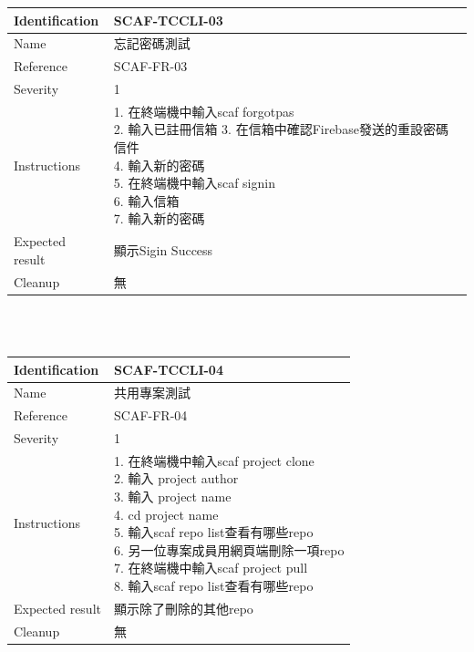 \documentclass{report}
\begin{document}
\begin{tabularx}{\textwidth}{
  |p{}%
  |p{}|%
  }
  \hline
  \centering Identification &  SCAF-TCCLI-03 \\
  \hline
  \centering Name & 忘記密碼測試 \\
  \hline
  \centering Reference & SCAF-FR-03 \\
  \hline
  \centering Severity & 1 \\
  \hline
  \centering Instructions & 
  \makecell[l]{
    1. 在終端機中輸入scaf forgotpas\\
    2. 輸入已註冊信箱
    3. 在信箱中確認Firebase發送的重設密碼信件 \\
    4. 輸入新的密碼 \\
    5. 在終端機中輸入scaf signin\\
    6. 輸入信箱 \\
    7. 輸入新的密碼 \\
  }\\
  \hline
  \centering Expected result & 顯示Sigin Success \\
  \hline
  \centering Cleanup & 無 \\
  \hline
\end{tabularx}
\\
\newline
\\

\begin{tabularx}{\textwidth}{
  |p{}%
  |p{}|%
  }
  \hline
  \centering Identification &  SCAF-TCCLI-04 \\
  \hline
  \centering Name & 共用專案測試 \\
  \hline
  \centering Reference & SCAF-FR-04 \\
  \hline
  \centering Severity & 1 \\
  \hline
  \centering Instructions & 
  \makecell[l]{
    1. 在終端機中輸入scaf project clone \\
    2. 輸入 project author \\
    3. 輸入 project name \\
    4. cd project name\\
    5. 輸入scaf repo list查看有哪些repo \\
    6. 另一位專案成員用網頁端刪除一項repo \\
    7. 在終端機中輸入scaf project pull \\ 
    8. 輸入scaf repo list查看有哪些repo \\
  }\\
  \hline
  \centering Expected result & 顯示除了刪除的其他repo \\
  \hline
  \centering Cleanup & 無 \\
  \hline
\end{tabularx}
\\
\newline
\\
\end{document}

